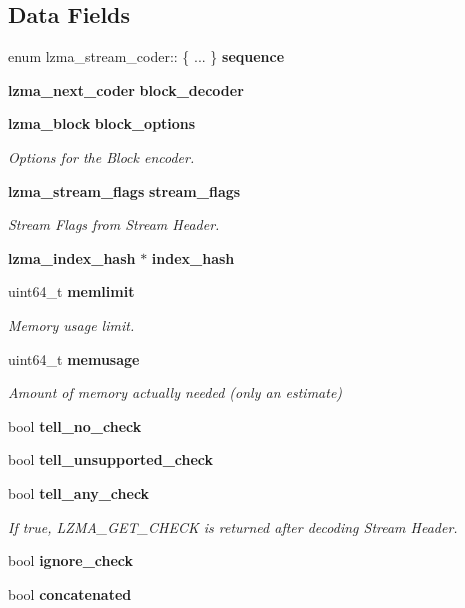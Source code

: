 \subsection*{Data Fields}
\begin{DoxyCompactItemize}
\item 
\mbox{\label{structlzma__stream__coder_ab3610fb82838ed2d72427f220955a2b7}} 
enum lzma\+\_\+stream\+\_\+coder\+:: \{ ... \}  {\bfseries sequence}
\item 
\textbf{ lzma\+\_\+next\+\_\+coder} \textbf{ block\+\_\+decoder}
\item 
\textbf{ lzma\+\_\+block} \textbf{ block\+\_\+options}
\begin{DoxyCompactList}\small\item\em Options for the Block encoder. \end{DoxyCompactList}\item 
\textbf{ lzma\+\_\+stream\+\_\+flags} \textbf{ stream\+\_\+flags}
\begin{DoxyCompactList}\small\item\em Stream Flags from Stream Header. \end{DoxyCompactList}\item 
\textbf{ lzma\+\_\+index\+\_\+hash} $\ast$ \textbf{ index\+\_\+hash}
\item 
uint64\+\_\+t \textbf{ memlimit}
\begin{DoxyCompactList}\small\item\em Memory usage limit. \end{DoxyCompactList}\item 
uint64\+\_\+t \textbf{ memusage}
\begin{DoxyCompactList}\small\item\em Amount of memory actually needed (only an estimate) \end{DoxyCompactList}\item 
bool \textbf{ tell\+\_\+no\+\_\+check}
\item 
bool \textbf{ tell\+\_\+unsupported\+\_\+check}
\item 
bool \textbf{ tell\+\_\+any\+\_\+check}
\begin{DoxyCompactList}\small\item\em If true, L\+Z\+M\+A\+\_\+\+G\+E\+T\+\_\+\+C\+H\+E\+CK is returned after decoding Stream Header. \end{DoxyCompactList}\item 
bool \textbf{ ignore\+\_\+check}
\item 
bool \textbf{ concatenated}
\item 

\end{DoxyCompactItemize}
